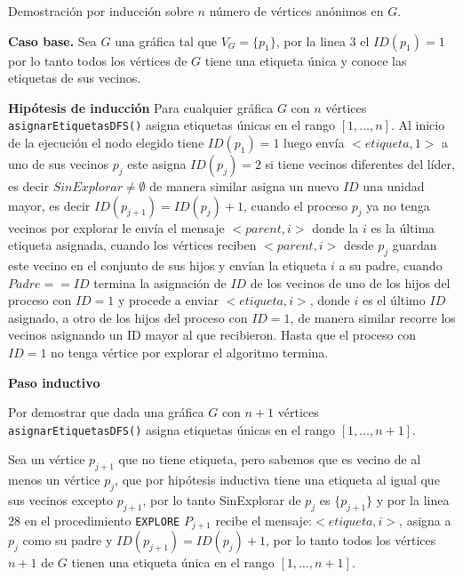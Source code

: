 Demostración por inducción sobre $n$ número de vértices anónimos en $G$.

\textbf{Caso base.} Sea $G$ una gráfica tal que $V_G=\{p_1\}$, por la linea $3$ el $ID(p_1)=1$ por lo tanto todos los vértices de $G$ tiene una etiqueta única y conoce las etiquetas de sus vecinos.

\textbf{Hipótesis de inducción}
Para cualquier gráfica $G$ con $n$ vértices {\tt asignarEtiquetasDFS()} asigna etiquetas únicas en el rango $[1,\dots, n]$.
Al inicio de la ejecución el nodo elegido tiene $ID(p_1)=1$ luego envía $<etiqueta, 1>$ a uno de sus vecinos $p_{j}$ este asigna $ID(p_j)=2$ si tiene vecinos diferentes del líder, es decir $SinExplorar \neq \emptyset$ de manera similar asigna un nuevo $ID$ una unidad mayor, es decir $ID(p_{j+1}) = ID(p_j)+1$, cuando el proceso $p_j$ ya no tenga vecinos por explorar le envía el mensaje $<parent,i>$ donde la $i$ es la última etiqueta asignada, cuando los vértices reciben $<parent,i>$ desde $p_j$ guardan este vecino en el conjunto de sus hijos y envían la etiqueta $i$ a su padre, cuando $Padre == ID$ termina la asignación de $ID$ de los vecinos de uno de los hijos del proceso con $ID=1$  y procede a enviar $<etiqueta,i>$, donde $i$ es el último $ID$ asignado, a otro de los hijos del proceso con $ID = 1$, de manera similar recorre los vecinos asignando un ID mayor al que recibieron. Hasta que el proceso con $ID = 1$ no tenga vértice por explorar el algoritmo termina.

\textbf{Paso inductivo}

Por demostrar que dada una gráfica $G$ con $n+1$ vértices {\tt asignarEtiquetasDFS()} asigna etiquetas únicas en el rango $[1,\dots, n+1]$.

Sea un vértice $p_{j+1}$ que no tiene etiqueta, pero sabemos que es vecino de al menos un vértice $p_j$, que por hipótesis inductiva tiene una etiqueta al igual que sus vecinos excepto $p_{j+1}$, por lo tanto SinExplorar de $p_j$ es $\{p_{j+1}\}$ y por la linea 28 en el procedimiento {\tt EXPLORE} $P_{j+1}$ recibe el mensaje:$<etiqueta,i>$, asigna a $p_j$ como su padre y $ID(p_{j+1})=ID(p_j)+1$, por lo tanto todos los vértices $n+1$ de $G$ tienen una etiqueta única en el rango $[1,\dots, n+1]$.

